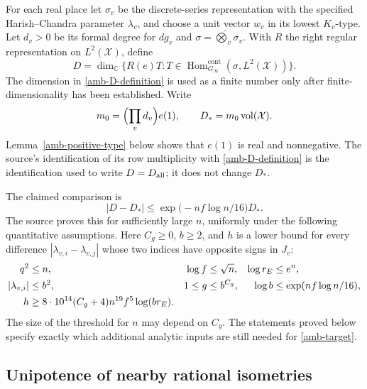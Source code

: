 For each real place let $\sigma_v$ be the discrete-series
representation with the specified Harish--Chandra parameter
$\lambda_v$, and choose a unit vector $w_v$ in its lowest
$K_v$-type. Let $d_v>0$ be its formal degree for $dg_v$ and
$\sigma=\widehat\bigotimes_v\sigma_v$. With $R$ the right regular
representation on $L^2(\mathcal X)$, define
\begin{equation}\label{amb-D-definition}
 D=\dim_{\mathbb C}
   \bigl\{R(e)T:T\in
       \operatorname{Hom}^{\mathrm{cont}}_{G_\infty}
                         (\sigma,L^2(\mathcal X))\bigr\}.
\end{equation}
The dimension in \eqref{amb-D-definition} is used as a finite number
only after finite-dimensionality has been established. Write
\begin{equation}\label{amb-main-term}
 m_0=\Bigl(\prod_v d_v\Bigr)e(1),\qquad
 D_*=m_0\operatorname{vol}(\mathcal X).
\end{equation}
Lemma~\ref{amb-positive-type} below shows that $e(1)$ is real and
nonnegative. The source's identification of its row multiplicity
with \eqref{amb-D-definition} is the identification used to write
$D=D_{\rm all}$; it does not change $D_*$.

The claimed comparison is
\begin{equation}\label{amb-target}
                 |D-D_*|\le
                  \exp\bigl(-nf\log n/16\bigr)D_*.
\end{equation}
The source proves this for sufficiently large $n$, uniformly under
the following quantitative assumptions. Here $C_g\ge0$, $b\ge2$,
and $h$ is a lower bound for every difference
$|\lambda_{v,i}-\lambda_{v,j}|$ whose two indices have opposite
signs in $J_v$:
\begin{align}
 q^2&\le n,& \log f&\le\sqrt n,& \log r_E&\le e^n,
                                                        \notag\\
 |\lambda_{v,i}|&\le b^2,&1\le g&\le b^{C_g},&
 \log b&\le\exp(nf\log n/16),                         \label{amb-parameters}\\
 h&\ge8\cdot10^{14}(C_g+4)n^{19}f^5\log(br_E).
                                                        \notag
\end{align}
The size of the threshold for $n$ may depend on $C_g$.
The statements proved below specify exactly which additional
analytic inputs are still needed for \eqref{amb-target}.

\subsection{Unipotence of nearby rational isometries}

